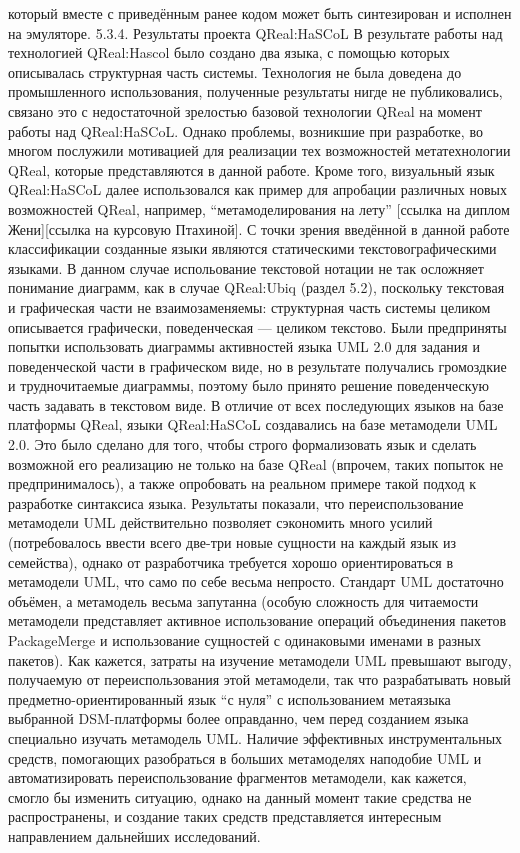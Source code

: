 который вместе с приведённым ранее кодом может быть синтезирован и исполнен на эмуляторе.
5.3.4. Результаты проекта QReal:HaSCoL
	В результате работы над технологией QReal:Hascol было создано два языка, с помощью которых описывалась структурная часть системы. Технология не была доведена до промышленного использования, полученные результаты нигде не публиковались, связано это с недостаточной зрелостью базовой технологии QReal на момент работы над QReal:HaSCoL. Однако проблемы, возникшие при разработке, во многом послужили мотивацией для реализации тех возможностей метатехнологии QReal, которые представляются в данной работе. Кроме того, визуальный язык QReal:HaSCoL далее использовался как пример для апробации различных новых возможностей QReal, например, “метамоделирования на лету” [ссылка на диплом Жени][ссылка на курсовую Птахиной].
	С точки зрения введённой в данной работе классификации созданные языки являются статическими текстовографическими языками. В данном случае испольование текстовой нотации не так осложняет понимание диаграмм, как в случае QReal:Ubiq (раздел 5.2), поскольку текстовая и графическая части не взаимозаменяемы: структурная часть системы целиком описывается графически, поведенческая --- целиком текстово. Были предприняты попытки использовать диаграммы активностей языка UML 2.0 для задания и поведенческой части в графическом виде, но в результате получались громоздкие и трудночитаемые диаграммы, поэтому было принято решение поведенческую часть задавать в текстовом виде.
	В отличие от всех последующих языков на базе платформы QReal, языки QReal:HaSCoL создавались на базе метамодели UML 2.0. Это было сделано для того, чтобы строго формализовать язык и сделать возможной его реализацию не только на базе QReal (впрочем, таких попыток не предпринималось), а также опробовать на реальном примере такой подход к разработке синтаксиса языка. Результаты показали, что переиспользование метамодели UML действительно позволяет сэкономить много усилий (потребовалось ввести всего две-три новые сущности на каждый язык из семейства), однако от разработчика требуется хорошо ориентироваться в метамодели UML, что само по себе весьма непросто. Стандарт UML достаточно объёмен, а метамодель весьма запутанна (особую сложность для читаемости метамодели представляет активное использование операций объединения пакетов PackageMerge и использование сущностей с одинаковыми именами в разных пакетов). Как кажется, затраты на изучение метамодели UML превышают выгоду, получаемую от переиспользования этой метамодели, так что разрабатывать новый предметно-ориентированный язык “с нуля” с использованием метаязыка выбранной DSM-платформы более оправданно, чем перед созданием языка специально изучать метамодель UML. Наличие эффективных инструментальных средств, помогающих разобраться в больших метамоделях наподобие UML и автоматизировать переиспользование фрагментов метамодели, как кажется, смогло бы изменить ситуацию, однако на данный момент такие средства не распространены, и создание таких средств представляется интересным направлением дальнейших исследований.
